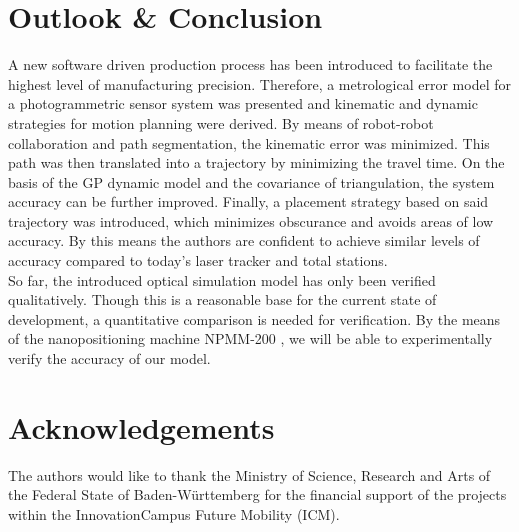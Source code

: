 \documentclass[5p,times,procedia]{elsarticle}
\begin{document}
\section{Outlook \& Conclusion}
A new software driven production process has been introduced to facilitate the highest level of manufacturing precision.
Therefore, a metrological error model for a photogrammetric sensor system was presented and kinematic and dynamic strategies
for motion planning were derived. By means of robot-robot collaboration and path segmentation, the kinematic error was minimized. This path was then translated into a trajectory by minimizing the travel time. On the basis of the GP dynamic model and the covariance of triangulation, the system accuracy can be further improved. Finally, a placement strategy based on said trajectory was introduced, which minimizes obscurance and avoids areas of low accuracy. By this means the authors are confident to achieve similar levels of accuracy compared to today's laser tracker and total stations.\\
So far, the introduced optical simulation model has only been verified qualitatively. Though this is a reasonable base for the current state of development, a quantitative comparison is needed for verification. By the means of the nanopositioning machine NPMM-200 \cite{Jaeger2016}, we will be able to experimentally verify the accuracy of our model.
%
\section*{Acknowledgements}
The authors would like to thank the Ministry of Science, Research and Arts of the Federal State of Baden-Württemberg for the financial support of the projects within the InnovationCampus Future Mobility (ICM).
%


%
\clearpage\onecolumn
%
\normalMode
%
\end{document}
